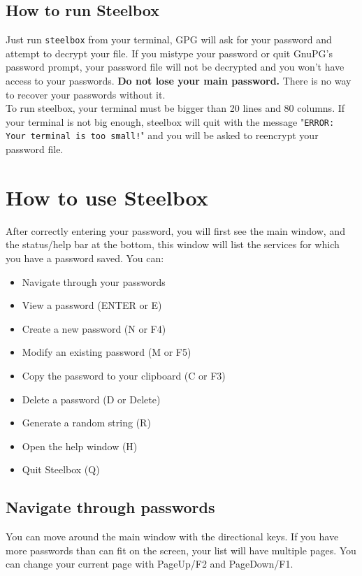 \documentclass{article}
\begin{document}
  \subsection{How to run Steelbox}
  Just run \texttt{steelbox} from your terminal, GPG will ask for your password and attempt to decrypt your file.
  If you mistype your password or quit GnuPG's password prompt, your password file will not be decrypted and
  you won't have access to your passwords. \textbf{Do not lose your main password.} There is no way to recover your passwords
  without it.\\
  To run steelbox, your terminal must be bigger than 20 lines and 80 columns. If your terminal is not big enough, steelbox
  will quit with the message "\texttt{ERROR: Your terminal is too small!}" and you will be asked to reencrypt your password file.

  \section{How to use Steelbox}
  After correctly entering your password, you will first see the main window, and the status/help bar at the bottom,
  this window will list the services for which you have a password saved. You can:
  \begin{itemize}
    \item Navigate through your passwords
    \item View a password (ENTER or E)
    \item Create a new password (N or F4)
    \item Modify an existing password (M or F5)
    \item Copy the password to your clipboard (C or F3)
    \item Delete a password (D or Delete)
    \item Generate a random string (R)
    \item Open the help window (H)
    \item Quit Steelbox (Q)
  \end{itemize}

  \subsection{Navigate through passwords}
  You can move around the main window with the directional keys. If you have more passwords than can fit on the screen, your list will have multiple pages.
  You can change your current page with PageUp/F2 and PageDown/F1.
\end{document}
